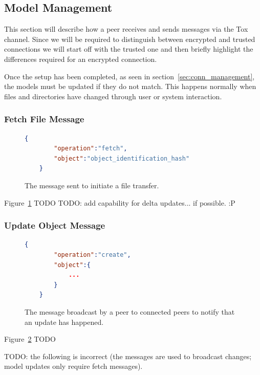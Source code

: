 \subsection{Model Management}

This section will describe how a peer receives and sends messages via the Tox channel.
Since we will be required to distinguish between encrypted and trusted connections we will start off with the trusted one and then briefly highlight the differences required for an encrypted connection.

Once the setup has been completed, as seen in section~\ref{sec:conn_management}, the models must be updated if they do not match.
This happens normally when files and directories have changed through user or system interaction.

\subsubsection{Fetch File Message}

\begin{figure}[htp]
    \begin{lstlisting}[language=json,firstnumber=0]
    {
        "operation":"fetch",
        "object":"object_identification_hash"
    }
    \end{lstlisting}
\caption[Fetch Object Message]{The message sent to initiate a file transfer.}
\label{json:fetch_file}
\end{figure}

Figure~\ref{json:fetch_file} TODO
TODO: add capability for delta updates... if possible. :P

\subsubsection{Update Object Message}

\begin{figure}[htp]
    \begin{lstlisting}[language=json,firstnumber=0]
    {
        "operation":"create",
        "object":{
            ...
        }
    }
    \end{lstlisting}
\caption[Update Object Message]{The message broadcast by a peer to connected peers to notify that an update has happened.}
\label{json:update_object}
\end{figure}

Figure~\ref{json:update_object} TODO

TODO: the following is incorrect (the messages are used to broadcast changes; model updates only require fetch messages).

